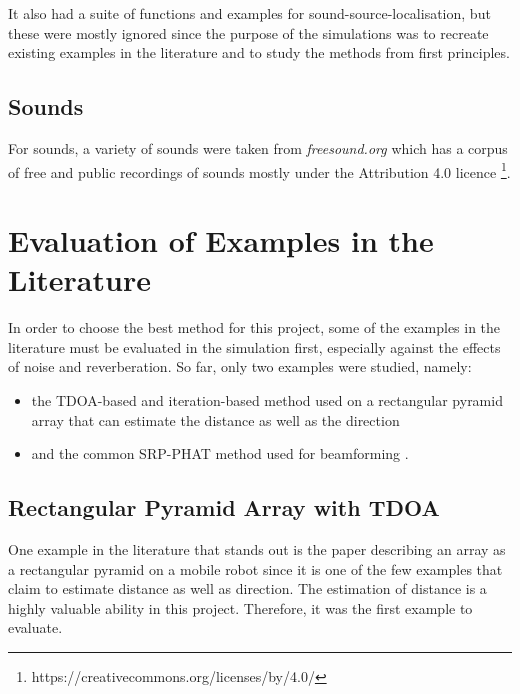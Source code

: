 \documentclass[notitlepage]{report}
\begin{document}
It also had a suite of functions and examples for sound-source-localisation, but these were mostly ignored since the purpose of the simulations was to recreate existing examples in the literature and to study the methods from first principles.

\subsection{Sounds}

For sounds, a variety of sounds were taken from \textit{freesound.org} which has a corpus of free and public recordings of sounds mostly under the Attribution 4.0 licence \footnote{https://creativecommons.org/licenses/by/4.0/}.

\section{Evaluation of Examples in the Literature}

In order to choose the best method for this project, some of the examples in the literature must be evaluated in the simulation first, especially against the effects of noise and reverberation. So far, only two examples were studied, namely:
\begin{itemize}
	\item the TDOA-based and iteration-based method used on a rectangular pyramid array that can estimate the distance as well as the direction \cite{chen_sound_2019}
	\item and the common SRP-PHAT method used for beamforming \cite{valin_localization_2004} \cite{valin_robust_2007}.
\end{itemize}



\subsection{Rectangular Pyramid Array with TDOA}

One example in the literature that stands out is the paper describing an array as a rectangular pyramid on a mobile robot \cite{chen_sound_2019} since it is one of the few examples that claim to estimate distance as well as direction. The estimation of distance is a highly valuable ability in this project. Therefore, it was the first example to evaluate.
\end{document}
